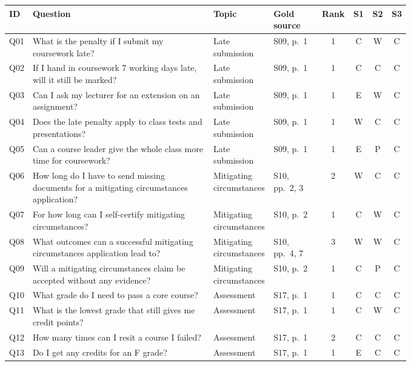 \begin{minipage}{15.29cm}\setlength{\linewidth}{15.29cm}\footnotesize\setlength{\tabcolsep}{3pt}
\begin{tabular}{L{0.05\linewidth}L{0.45\linewidth}L{0.15\linewidth}L{0.12\linewidth}cccc}
\toprule
ID & Question & Topic & Gold source & Rank & S1 & S2 & S3 \\
\midrule

Q01 & What is the penalty if I submit my coursework late? & Late submission & S09, p.~1 & 1 & C & W & C \\
Q02 & If I hand in coursework 7 working days late, will it still be marked? & Late submission & S09, p.~1 & 1 & C & C & C \\
Q03 & Can I ask my lecturer for an extension on an assignment? & Late submission & S09, p.~1 & 1 & E & W & C \\
Q04 & Does the late penalty apply to class tests and presentations? & Late submission & S09, p.~1 & 1 & W & C & C \\
Q05 & Can a course leader give the whole class more time for coursework? & Late submission & S09, p.~1 & 1 & E & P & C \\
Q06 & How long do I have to send missing documents for a mitigating circumstances application? & Mitigating circumstances & S10, pp.~2, 3 & 2 & W & C & C \\
Q07 & For how long can I self-certify mitigating circumstances? & Mitigating circumstances & S10, p.~2 & 1 & C & W & C \\
Q08 & What outcomes can a successful mitigating circumstances application lead to? & Mitigating circumstances & S10, pp.~4, 7 & 3 & W & W & C \\
Q09 & Will a mitigating circumstances claim be accepted without any evidence? & Mitigating circumstances & S10, p.~2 & 1 & C & P & C \\
Q10 & What grade do I need to pass a core course? & Assessment & S17, p.~1 & 1 & C & C & C \\
Q11 & What is the lowest grade that still gives me credit points? & Assessment & S17, p.~1 & 1 & C & W & C \\
Q12 & How many times can I resit a course I failed? & Assessment & S17, p.~1 & 2 & C & C & C \\
Q13 & Do I get any credits for an F grade? & Assessment & S17, p.~1 & 1 & E & C & C \\

\end{tabular}
\end{minipage}
